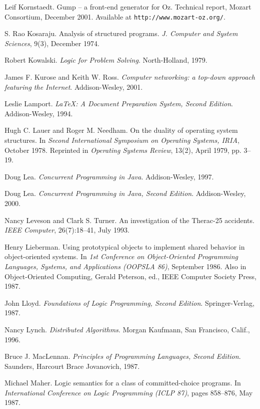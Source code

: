 \begin{thebibliography}{213}
Leif Kornstaedt. Gump – a front-end generator for Oz. Technical report, Mozart Consortium, December 2001. Available at \verb"http://www.mozart-oz.org/".

S. Rao Kosaraju. Analysis of structured programs. \emph{J. Computer and System Sciences}, 9(3), December 1974.

Robert Kowalski. \emph{Logic for Problem Solving}. North-Holland, 1979.

James F. Kurose and Keith W. Ross. \emph{Computer networking: a top-down approach featuring the Internet}. Addison-Wesley, 2001.

Leslie Lamport. \emph{\LaTeX: A Document Preparation System, Second Edition}. Addison-Wesley, 1994.

Hugh C. Lauer and Roger M. Needham. On the duality of operating system structures. In \emph{Second International Symposium on Operating Systems, IRIA}, October 1978. Reprinted in \emph{Operating Systems Review}, 13(2), April 1979, pp. 3–19.

Doug Lea. \emph{Concurrent Programming in Java}. Addison-Wesley, 1997.

Doug Lea. \emph{Concurrent Programming in Java, Second Edition}. Addison-Wesley, 2000.

Nancy Leveson and Clark S. Turner. An investigation of the Therac-25 accidents. \emph{IEEE Computer}, 26(7):18–41, July 1993.

Henry Lieberman. Using prototypical objects to implement shared behavior in object-oriented systems. In \emph{1st Conference on Object-Oriented Programming Languages, Systems, and Applications (OOPSLA 86)}, September 1986. Also in Object-Oriented Computing, Gerald Peterson, ed., IEEE Computer Society Press, 1987.

John Lloyd. \emph{Foundations of Logic Programming, Second Edition}. Springer-Verlag, 1987.

Nancy Lynch. \emph{Distributed Algorithms}. Morgan Kaufmann, San Francisco, Calif., 1996.

Bruce J. MacLennan. \emph{Principles of Programming Languages, Second Edition}. Saunders, Harcourt Brace Jovanovich, 1987.

Michael Maher. Logic semantics for a class of committed-choice programs. In \emph{International Conference on Logic Programming (ICLP 87)}, pages 858–876, May 1987.


\end{thebibliography}

